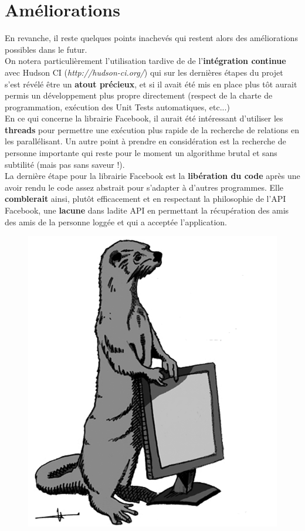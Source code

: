 \documentclass[a4paper, titlepage, oneside]{book}
\begin{document}
\section{Améliorations}
En revanche, il reste quelques points inachevés qui restent alors des améliorations possibles dans le futur.\\

On notera particulièrement l'utilisation tardive de de l'\textbf{intégration continue} avec Hudson CI (\emph{http://hudson-ci.org/}) qui sur les dernières étapes du projet s'est révélé être un \textbf{atout précieux}, et si il avait été mis en place plus tôt aurait permis un développement plus propre directement (respect de la charte de programmation, exécution des Unit Tests automatiques, etc...)\\

En ce qui concerne la librairie Facebook, il aurait été intéressant d'utiliser les \textbf{threads} pour permettre une exécution plus rapide de la recherche de relations en les parallélisant. Un autre point à prendre en considération est la recherche de personne importante qui reste pour le moment un algorithme brutal et sans subtilité (mais pas sans saveur !).\\

La dernière étape pour la librairie Facebook est la \textbf{libération du code} après une avoir rendu le code assez abstrait pour s'adapter à d'autres programmes. Elle \textbf{comblerait} ainsi, plutôt efficacement et en respectant la philosophie de l'API Facebook, une \textbf{lacune} dans ladite API en permettant la récupération des amis des amis de la personne loggée et qui a acceptée l'application.\\

\newpage

\begin{figure}[p]
\centering
\includegraphics[width=\textwidth]{LoutreGauche.png}
\end{figure}
\end{document}
